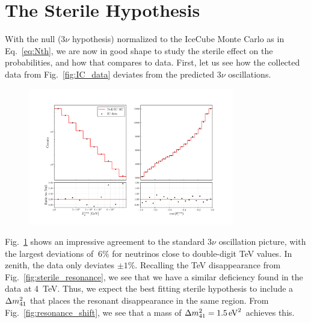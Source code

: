 % 

% 
\section{The Sterile Hypothesis}
With the null ($3\nu$ hypothesis) normalized to the IceCube Monte Carlo as in Eq.~\ref{eq:Nth}, we are now in good shape to study the sterile effect on the probabilities, and how that compares to data.
First, let us see how the collected data from Fig.~\ref{fig:IC_data} deviates from the predicted $3\nu$ oscillations.
\begin{figure}
    \centering
    \includegraphics[width=0.8\textwidth]{figures/IC_rates.pdf}
    \caption{}\label{fig:IC_rates}
\end{figure}
Fig.~\ref{fig:IC_rates} shows an impressive agreement to the standard $3\nu$ oscillation picture, with the largest deviations of $~6\%$
for neutrinos close to double-digit \si{\TeV} values. In zenith, the data only deviates $\pm 1\%$. Recalling the \si{\TeV} disappearance from 
Fig.~\ref{fig:sterile_resonance}, we see that we have a similar deficiency found in the data at \SI{4}{\TeV}. Thus, we expect the best fitting 
sterile hypothesis to include a $\dm[41]$ that places the resonant disappearance in the same region. From Fig.~\ref{fig:resonance_shift}, we see
that a mass of $\dm[41] = \SI{1.5}{\eV \squared}$ achieves this. 

